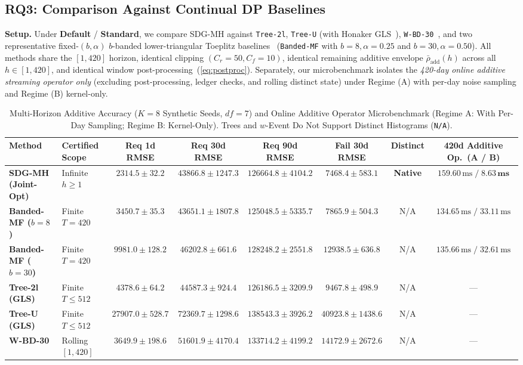 \documentclass[sigconf, nonacm]{acmart}
\begin{document}
\subsection{RQ3: Comparison Against Continual DP Baselines}
\textbf{Setup.} Under \textbf{Default} / \textbf{Standard}, we compare SDG-MH against \texttt{Tree-2l}, \texttt{Tree-U} (with Honaker GLS~\cite{honaker2015efficient}), \texttt{W-BD-30}~\cite{kellaris2014wevent}, and two representative fixed-$(b,\alpha)$ $b$-banded lower-triangular Toeplitz baselines~\cite{fichtenberger2023constant,choquette2023banded} (\texttt{Banded-MF} with $b=8,\alpha=0.25$ and $b=30,\alpha=0.50$). All methods share the $[1,420]$ horizon, identical clipping $(C_r=50, C_f=10)$, identical remaining additive envelope $\bar{\rho}_{\mathrm{add}}(h)$ across all $h \in [1, 420]$, and identical window post-processing~(\ref{eq:postproc}). Separately, our microbenchmark isolates the \emph{420-day online additive streaming operator only} (excluding post-processing, ledger checks, and rolling distinct state) under Regime (A) with per-day noise sampling and Regime (B) kernel-only.

\begin{table}[t]
\centering
\caption{Multi-Horizon Additive Accuracy ($K=8$ Synthetic Seeds, $df=7$) and Online Additive Operator Microbenchmark (Regime A: With Per-Day Sampling; Regime B: Kernel-Only). Trees and $w$-Event Do Not Support Distinct Histograms (\texttt{N/A}).}
\label{tab:baselines_all}
\footnotesize
\setlength{\tabcolsep}{4.2pt}
\begin{tabular}{@{}llcccccc@{}}
\toprule
\textbf{Method} & \textbf{Certified Scope} & \textbf{Req 1d RMSE} & \textbf{Req 30d RMSE} & \textbf{Req 90d RMSE} & \textbf{Fail 30d RMSE} & \textbf{Distinct} & \textbf{420d Additive Op.\ (A / B)} \\ \midrule
\textbf{SDG-MH (Joint-Opt)} & Infinite $h \ge 1$ & $\mathbf{2314.5\pm 32.2}$ & $43866.8\pm 1247.3$ & $126664.8\pm 4104.2$ & $\mathbf{7468.4\pm 583.1}$ & \textbf{Native} & $159.60\,\text{ms} \;/\; \mathbf{8.63\,\text{ms}}$ \\
\textbf{Banded-MF ($b=8$)} & Finite $T=420$ & $3450.7\pm 35.3$ & $\mathbf{43651.1\pm 1807.8}$ & $\mathbf{125048.5\pm 5335.7}$ & $7865.9\pm 504.3$ & N/A & $134.65\,\text{ms} \;/\; 33.11\,\text{ms}$ \\
\textbf{Banded-MF ($b=30$)} & Finite $T=420$ & $9981.0\pm 128.2$ & $46202.8\pm 661.6$ & $128248.2\pm 2551.8$ & $12938.5\pm 636.8$ & N/A & $135.66\,\text{ms} \;/\; 32.61\,\text{ms}$ \\
\textbf{Tree-2l (GLS)} & Finite $T \le 512$ & $4378.6\pm 64.2$ & $44587.3\pm 924.4$ & $126186.5\pm 3209.9$ & $9467.8\pm 498.9$ & N/A & --- \\
\textbf{Tree-U (GLS)} & Finite $T \le 512$ & $27907.0\pm 528.7$ & $72369.7\pm 1298.6$ & $138543.3\pm 3926.2$ & $40923.8\pm 1438.6$ & N/A & --- \\
\textbf{W-BD-30} & Rolling $[1,420]$ & $3649.9\pm 198.6$ & $51601.9\pm 4170.4$ & $133714.2\pm 4199.2$ & $14172.9\pm 2672.6$ & N/A & --- \\ \bottomrule
\end{tabular}
\end{table}
\end{document}
